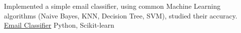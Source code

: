 \begin{cventries}
  \cventry
    {Implemented a simple email classifier, using common Machine Learning algorithms (Naive Bayes, KNN, Decision Tree, SVM), studied their accuracy.} %
    {\href{https://github.com/rajdeepbharati/Email-Classifier}{Email Classifier}} %
    {Python, Scikit-learn} %
    {} %
    {}
    \vspace{-\baselineskip}
\begin{comment}

  \cventry
    {A collection of python scripts to automate Facebook.} %
    {\href{https://github.com/rajdeepbharati/FB-Automation}{FB Automation}} %
    {Python, Selenium} %
    {} %
    {}
    \vspace{-\baselineskip}

  \cventry
    {A collection of python scripts to automate Facebook.} %
    {\href{https://github.com/rajdeepbharati/FB-Automation}{FB Automation}} %
    {Python, Selenium} %
    {} %
    {
      \begin{cvitems} %
      \end{cvitems}
    }
    \vspace{-\baselineskip}

\end{comment}

\begin{comment}
  \cventry
    {Member} %
    {PLUS (Laboratory for UNIX Security in POSTECH)} %
    {Pohang, S.Korea} %
    {Sep. 2010 - Oct. 2011} %
    {
      \begin{cvitems} %
        \item {Gained expertise in hacking \& security areas, especially about internal of operating system based on UNIX and several exploit techniques.}
        \item {Participated on several hacking competition and won a good award.}
        \item {Conducted periodic security checks on overall IT system as a member of POSTECH CERT.}
        \item {Conducted penetration testing commissioned by national agency and corporation.}
      \end{cvitems}
    }

\end{comment}
\end{cventries}

